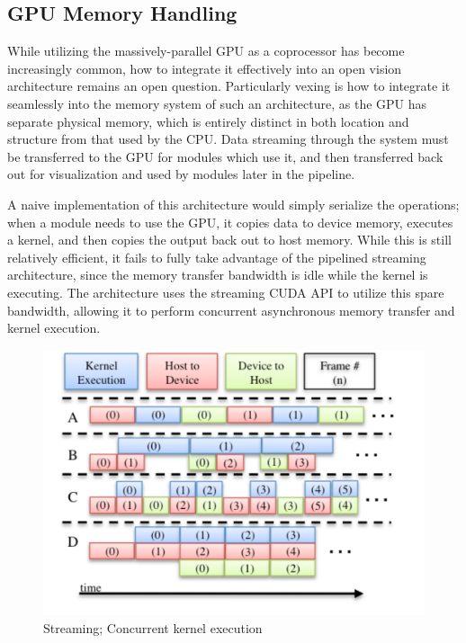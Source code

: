 \subsection{GPU Memory Handling}
While utilizing the massively-parallel GPU as a coprocessor has become increasingly common, how to integrate it effectively into an open vision architecture remains an open question. Particularly vexing is how to integrate it seamlessly into the memory system of such an architecture, as the GPU has separate physical memory, which is entirely distinct in both location and structure from that used by the CPU. Data streaming through the system must be transferred to the GPU for modules which use it, and then transferred back out for visualization and used by modules later in the pipeline.

A naive implementation of this architecture would simply serialize the operations; when a module needs to use the GPU, it copies data to device memory, executes a kernel, and then copies the output back out to host memory. While this is still relatively efficient, it fails to fully take advantage of the pipelined streaming architecture, since the memory transfer bandwidth is idle while the kernel is executing. The architecture uses the streaming CUDA API to utilize this spare bandwidth, allowing it to perform concurrent asynchronous memory transfer and kernel execution. 

\begin{figure}[t]
\begin{center}
\includegraphics[width=0.7\linewidth]{ConcurrentGPU.pdf}
\end{center}
   \caption[Streaming and Concurrent Kernels]{Streaming; Concurrent kernel execution}
\label{fig:Streaming}
\end{figure}

